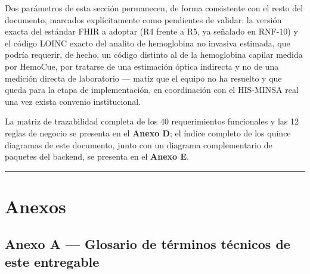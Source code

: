 \documentclass[11pt,a4paper]{article}
\begin{document}
Dos parámetros de esta sección permanecen, de forma consistente con el resto del documento, marcados explícitamente como pendientes de validar: la versión exacta del estándar FHIR a adoptar (R4 frente a R5, ya señalado en RNF-10) y el código LOINC exacto del analito de hemoglobina no invasiva estimada, que podría requerir, de hecho, un código distinto al de la hemoglobina capilar medida por HemoCue, por tratarse de una estimación óptica indirecta y no de una medición directa de laboratorio --- matiz que el equipo no ha resuelto y que queda para la etapa de implementación, en coordinación con el HIS-MINSA real una vez exista convenio institucional.

La matriz de trazabilidad completa de los 40 requerimientos funcionales y las 12 reglas de negocio se presenta en el \textbf{Anexo D}; el índice completo de los quince diagramas de este documento, junto con un diagrama complementario de paquetes del backend, se presenta en el \textbf{Anexo E}.

\begin{center}\rule{0.5\linewidth}{0.5pt}\end{center}

\section{Anexos}\label{anexos}

\subsection{Anexo A --- Glosario de términos técnicos de este entregable}\label{anexo-a-glosario-de-tuxe9rminos-tuxe9cnicos-de-este-entregable}
\end{document}
